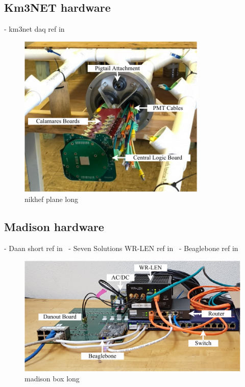 \subsection{Km3NET hardware} %
\label{sec:daq_hard_km3net} %

- km3net daq ref in~\cite{biagi2015, adrian2016, eijk2015}

\begin{figure} %
    \includegraphics[width=0.8\textwidth]{diagrams/5-daq/nikhef_plane.pdf}
    \caption[nikhef plane short]
    {nikhef plane long}
    \label{fig:nikhef_plane}
\end{figure}

\subsection{Madison hardware} %
\label{sec:daq_hard_madison} %

- Daan short ref in~\cite{eijk2018}
- Seven Solutions WR-LEN ref in~\cite{wrlen2020}
- Beaglebone ref in~\cite{beagle2020}

\begin{figure} %
    \includegraphics[width=\textwidth]{diagrams/5-daq/madison_box.pdf}
    \caption[madison box short]
    {madison box long}
    \label{fig:madison_box}
\end{figure}

